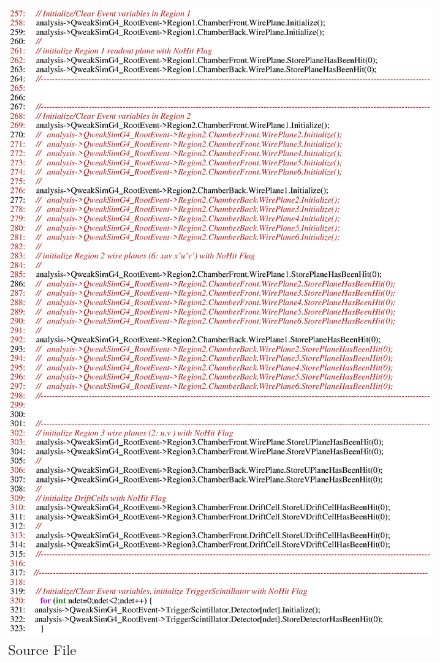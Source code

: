 \begin{figure}[h]
  \hspace{0cm}
  \includegraphics[scale=0.8]{./figures13/QweakSimEventAction.cc-p5.eps}
  \caption{Source File}
           \label{fig:XIII-SC-20}
\end{figure}

\clearpage

